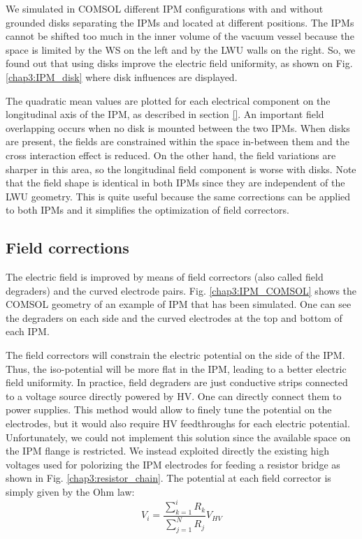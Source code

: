 \begin{refsection}
  We simulated in COMSOL different IPM configurations with and without grounded disks separating the IPMs and located at different positions. The IPMs cannot be shifted too much in the inner volume of the vacuum vessel because the space is limited by the WS on the left and by the LWU walls on the right. So, we found out that using disks improve the electric field uniformity, as shown on Fig. \ref{chap3:IPM_disk} where disk influences are displayed.

  

  The quadratic mean values are plotted for each electrical component on the longitudinal axis of the IPM, as described in section \ref{}. An important field overlapping occurs when no disk is mounted between the two IPMs. When disks are present, the fields are constrained within the space in-between them and the cross interaction effect is reduced. On the other hand, the field variations are sharper in this area, so the longitudinal field component is worse with disks. Note that the field shape is identical in both IPMs since they are independent of the LWU geometry. This is quite useful because the same corrections can be applied to both IPMs and it simplifies the optimization of field correctors.

  \subsection{Field corrections}
  \label{chap3:field_corrections}
  
  The electric field is improved by means of field correctors (also called field degraders) and the curved electrode pairs. Fig. \ref{chap3:IPM_COMSOL} shows the COMSOL geometry of an example of IPM that has been simulated. One can see the degraders on each side and the curved electrodes at the top and bottom of each IPM.

  The field correctors will constrain the electric potential on the side of the IPM. Thus, the iso-potential will be more flat in the IPM, leading to a better electric field uniformity. In practice, field degraders are just conductive strips connected to a voltage
  source directly powered by HV. One can directly connect them to power supplies. This method would allow to finely tune the potential on the electrodes, but it would also require HV feedthroughs for each electric potential. Unfortunately, we could not implement this solution since the available space on the IPM flange is restricted. We instead exploited directly the existing high voltages used for polorizing the IPM electrodes for feeding a resistor bridge as shown in Fig. \ref{chap3:resistor_chain}. The potential at each field corrector is simply given by the Ohm law:
  \begin{equation}
    V_{i} = \frac{\sum_{k = 1}^{i} R_{k}}{\sum_{j = 1}^{N} R_{j}}V_{HV} \label{chap3:PontDiviseur}
  \end{equation}


\end{refsection}
